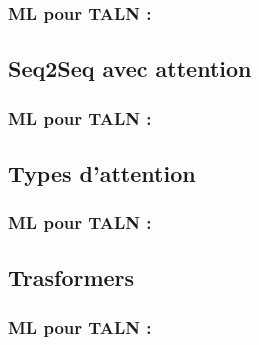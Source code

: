 \documentclass[xcolor=table]{beamer}
\begin{document}
\begin{frame}
	\frametitle{ML pour TALN : \insertsection}
	\framesubtitle{\insertsubsection}
	
\end{frame}

\subsection{Seq2Seq avec attention}

\begin{frame}
	\frametitle{ML pour TALN : \insertsection}
	\framesubtitle{\insertsubsection}
	
\end{frame}

\subsection{Types d'attention}

\begin{frame}
	\frametitle{ML pour TALN : \insertsection}
	\framesubtitle{\insertsubsection}
	
\end{frame}


\subsection{Trasformers}

\begin{frame}
	\frametitle{ML pour TALN : \insertsection}
	\framesubtitle{\insertsubsection}
	
\end{frame}

\end{document}
